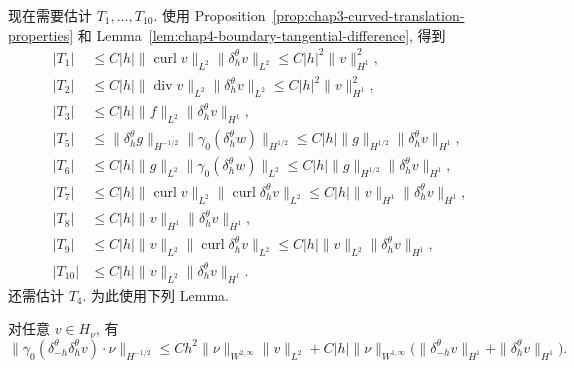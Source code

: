 \begin{Proof}
\begin{itemize}
现在需要估计 $T_1,\ldots,T_{10}$. 使用 Proposition~\ref{prop:chap3-curved-translation-properties} 和 Lemma~\ref{lem:chap4-boundary-tangential-difference}, 得到
\begin{align*}
 |T_1|&\leq C|h|\|\operatorname{curl}v\|_{L^2}\|\delta_h^\theta v\|_{L^2}
 \leq C|h|^2\|v\|_{H^1}^2,\\
 |T_2|&\leq C|h|\|\operatorname{div}v\|_{L^2}\|\delta_h^\theta v\|_{L^2}
 \leq C|h|^2\|v\|_{H^1}^2,\\
 |T_3|&\leq C|h|\|f\|_{L^2}\|\delta_h^\theta v\|_{H^1},\\
 |T_5|&\leq\|\delta_h^\theta g\|_{H^{-1/2}}\|\gamma_0(\delta_h^\theta w)\|_{H^{1/2}}
 \leq C|h|\|g\|_{H^{1/2}}\|\delta_h^\theta v\|_{H^1},\\
 |T_6|&\leq C|h|\|g\|_{L^2}\|\gamma_0(\delta_h^\theta w)\|_{L^2}
 \leq C|h|\|g\|_{H^{1/2}}\|\delta_h^\theta v\|_{H^1},\\
 |T_7|&\leq C|h|\|\operatorname{curl}v\|_{L^2}\|\operatorname{curl}\delta_h^\theta v\|_{L^2}
 \leq C|h|\|v\|_{H^1}\|\delta_h^\theta v\|_{H^1},\\
 |T_8|&\leq C|h|\|v\|_{H^1}\|\delta_h^\theta v\|_{H^1},\\
 |T_9|&\leq C|h|\|v\|_{L^2}\|\operatorname{curl}\delta_h^\theta v\|_{L^2}
 \leq C|h|\|v\|_{L^2}\|\delta_h^\theta v\|_{H^1},\\
 |T_{10}|&\leq C|h|\|v\|_{L^2}\|\delta_h^\theta v\|_{H^1}.
\end{align*}
还需估计 $T_4$. 为此使用下列 Lemma.

\begin{Lemma}
\label{lem:chap4-double-tangential-normal-trace}
对任意 $v\in H_\nu$, 有
\[
 \|\gamma_0(\delta_{-h}^\theta\delta_h^\theta v)\cdot\nu\|_{H^{-1/2}}
 \leq Ch^2\|\nu\|_{W^{2,\infty}}\|v\|_{L^2}
 +C|h|\|\nu\|_{W^{1,\infty}}
 \bigl(\|\delta_{-h}^\theta v\|_{H^1}+\|\delta_h^\theta v\|_{H^1}\bigr).
\]
\end{Lemma}


\end{itemize}
\end{Proof}
